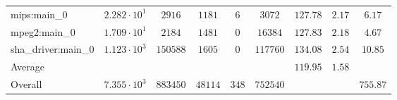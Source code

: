 \begin{tabular}{|l|c|c|c|c|c|c|c|c|}
mips:main\_0            & $ 2.282 \cdot 10^{1} $ & $ 2916   $ & $ 1181  $ & $ 6   $ & $ 3072   $ & $ 127.78      $ & $ 2.17    $ & $ 6.17    $ \\
mpeg2:main\_0           & $ 1.709 \cdot 10^{1} $ & $ 2184   $ & $ 1481  $ & $ 0   $ & $ 16384  $ & $ 127.83      $ & $ 2.18    $ & $ 4.67    $ \\
sha\_driver:main\_0     & $ 1.123 \cdot 10^{3} $ & $ 150588 $ & $ 1605  $ & $ 0   $ & $ 117760 $ & $ 134.08      $ & $ 2.54    $ & $ 10.85   $ \\
\hline
Average                 & $                    $ & $        $ & $       $ & $     $ & $        $ & $ 119.95      $ & $ 1.58    $ & $         $ \\
\hline
Overall                 & $ 7.355 \cdot 10^{3} $ & $ 883450 $ & $ 48114 $ & $ 348 $ & $ 752540 $ & $             $ & $         $ & $ 755.87  $ \\
\hline
\end{tabular}
